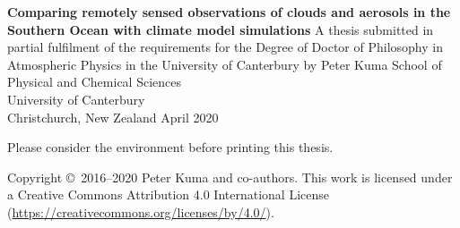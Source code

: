 \thispagestyle{empty}
\begin{center}
\null
\vfill
\LARGE
\textbf{Comparing remotely sensed observations of clouds and
aerosols in the Southern Ocean with climate model
simulations}
\vfill
\large
A thesis submitted in partial fulfilment of the requirements for the Degree
of Doctor of Philosophy in Atmospheric Physics
in the University of Canterbury
by Peter Kuma
\vfill
School of Physical and Chemical Sciences\\
University of Canterbury\\
Christchurch, New Zealand
\vfill
April 2020
\vfill
\end{center}
\clearpage
\thispagestyle{empty}
\null
\vfill
\noindent
\begin{center}
Please consider the environment before printing this thesis.
\end{center}
\vfill
\noindent
Copyright \copyright\ 2016--2020 Peter Kuma and co-authors. This work is licensed under a Creative Commons Attribution 4.0 International License (\url{https://creativecommons.org/licenses/by/4.0/}).
